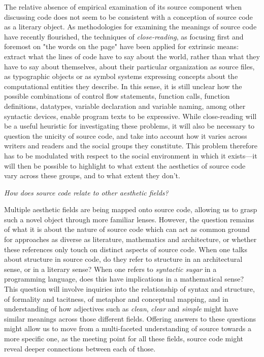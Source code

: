 The relative absence of empirical examination of its source component when discussing code does not seem to be consistent with a conception of source code as a literary object. As methodologies for examining the meanings of source code have recently flourished, the techniques of \emph{close-reading}, as focusing first and foremost on "the words on the page" \citep{richards_practical_1930} have been applied for extrinsic means: extract what the lines of code have to say about the world, rather than what they have to say about themselves, about their particular organization as source files, as typographic objects or as symbol systems expressing concepts about the computational entities they describe. In this sense, it is still unclear how the possible combinations of control flow statements, function calls, function definitions, datatypes, variable declaration and variable naming, among other syntactic devices, enable program texts to be expressive. While close-reading will be a useful heuristic for investigating these problems, it will also be necessary to question the unicity of source code, and take into account how it varies across writers and readers and the social groups they constitute. This problem therefore has to be modulated with respect to the social environment in which it exists—it will then be possible to highlight to what extent the aesthetics of source code vary across these groups, and to what extent they don't.

\vspace*{1\baselineskip}

\emph{How does source code relate to other aesthetic fields?}

Multiple aesthetic fields are being mapped onto source code, allowing us to grasp such a novel object through more familiar lenses. However, the question remains of what it is about the nature of source code which can act as common ground for approaches as diverse as literature, mathematics and architecture, or whether these references only touch on distinct aspects of source code. When one talks about structure in source code, do they refer to structure in an architectural sense, or in a literary sense? When one refers to \emph{syntactic sugar} in a programming language, does this have implications in a mathematical sense? This question will involve inquiries into the relationship of syntax and structure, of formality and tacitness,  of metaphor and conceptual mapping, and in understanding of how adjectives such as \emph{clean}, \emph{clear} and \emph{simple} might have similar meanings across those different fields. Offering answers to these questions might allow us to move from a multi-faceted understanding of source towards a more specific one, as the meeting point for all these fields, source code might reveal deeper connections between each of those.

